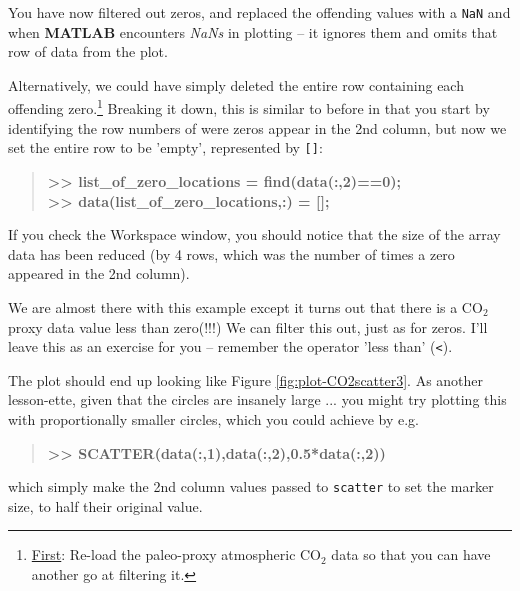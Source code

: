 \documentclass{tufte-book} %
\newenvironment{docspecbold}{\begin{quotation}\ttfamily\bfseries\parskip0pt\parindent0pt\ignorespaces}{\end{quotation}}
\begin{document}
You have now filtered out zeros, and replaced the offending values with a \texttt{NaN} and when \textbf{MATLAB} encounters \textit{NaNs} in plotting -- it ignores them and omits that row of data from the plot.
 
Alternatively, we could have simply deleted the entire row containing each offending zero.\footnote{\uline{First}: Re-load  the paleo-proxy atmospheric CO\(_{2}\) data so that you can have another go at filtering it.} Breaking it down, this is similar to before in that you start by identifying the row numbers of were zeros appear in the 2nd column, but now we set the entire row to be 'empty', represented by \texttt{[]}:
\begin{docspecbold}
>> list\_of\_zero\_locations = find(data(:,2)==0);
\\ >> data(list\_of\_zero\_locations,:) = [];
\end{docspecbold}
If you check the \textsf{Workspace window}, you should notice that the size of the array data has been reduced (by 4 rows, which was the number of times a zero appeared in the 2nd column).

We are almost there with this example except it turns out that there is a CO\(_{2}\) proxy data value less than zero(!!!) We can filter this out, just as for zeros. I'll leave this as an exercise for you -- remember the operator 'less than' (\texttt{<}).

The plot should end up looking like Figure \ref{fig:plot-CO2scatter3}. As another lesson-ette, given that the circles are insanely large ... you might try plotting this with proportionally smaller circles, which you could achieve by e.g.
\begin{docspecbold}
>> SCATTER(data(:,1),data(:,2),0.5*data(:,2))
\end{docspecbold}
which simply make the 2nd column values passed to \texttt{scatter} to set the marker size, to half their original value.
\end{document}
